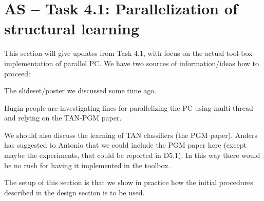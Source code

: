 

\section{AS -- Task 4.1: Parallelization of structural learning}\label{sec:parallel}



This section will give updates from Task 4.1, with focus on the actual tool-box implementation of parallel PC. We have two sources of information/ideas how to proceed: 
\bit
\item The slideset/poster we discussed some time ago.
\item Hugin people are investigating lines for parallelizing the PC using  multi-thread and relying on the TAN-PGM paper.
\eit

We should also discuss the learning of TAN classifiers (the PGM paper). Anders has suggested to Antonio that we could include the PGM paper here (except maybe the experiments, that could be reported in D5.1).
In this way there would be no rush for having it implemented in the toolbox.

The setup of this section is that we show in practice how the initial procedures described in the design section is to be used.